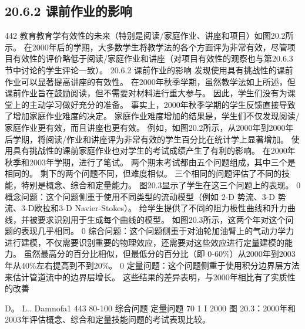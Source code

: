\documentclass[UTF8,11pt,a4paper,openany,fontset=fandol]{ctexbook}
\begin{document}
\subsection{20.6.2 课前作业的影响}
442 教育教育学有效性的未来（特别是阅读/家庭作业、讲座和项目）如图20.2所示。 在2000年后的学期，大多数学生将教学法的各个方面评为非常有效，尽管项目有效性的评价略低于阅读/家庭作业和讲座（对项目有效性的观察也与第20.6.3节中讨论的学生评论一致）。 20.6.2 课前作业的影响 发现使用具有挑战性的课前作业可以显著提高讲座的有效性。 在2000年秋季学期，虽然教学法如上所述，但课前作业旨在鼓励阅读，但不需要对材料进行重大参与。 因此，学生们没有为课堂上的主动学习做好充分的准备。 事实上，2000年秋季学期的学生反馈直接导致了增加家庭作业难度的决定。 家庭作业难度增加的结果是，学生们不仅发现阅读/家庭作业更有效，而且讲座也更有效。 例如，如图20.2所示，从2000年到2000年后学期，将阅读/作业和讲座评为非常有效的学生百分比在统计学上显著增加。 使用具有挑战性的课前家庭作业也对学生的考试成绩产生了有利的影响。 在2000年秋季和2003年学期，进行了笔试。 两个期末考试都由五个问题组成，其中三个是相同的。 剩下的两个问题不同，但难度相似。 三个相同的问题评估了不同的技能，特别是概念、综合和定量能力。 图20.3显示了学生在这三个问题上的表现。 0 概念问题：这个问题侧重于使用不同类型的流动模型（例如 2-D 势流、3-D 势流、3-D欧拉和3-D Navier-Stokes）。 给学生提供了不同的阻力极性曲线和升力曲线，并被要求识别用于生成每个曲线的模型。 如图20.3所示，这两个年对这个问题的表现几乎相同。 0 综合问题：这个问题侧重于对油轮加油臂上的气动力学力进行建模，不仅需要识别重要的物理效应，还需要对这些效应进行定量建模的能力。 虽然最高分的百分比相似，但最低分的百分比（即 0-60\%）从2000年到2003年从40\%左右提高到不到20\%。 0 定量问题：这个问题侧重于使用积分边界层方法来估计管道流中的边界层增长。 这些结果的差异表明，与2000年相比有了实质性的改善

D。 L.. Damnofa1 443 80-100 综合问题 定量问题 70 1 I 2000 图 20.3：2000年和2003年评估概念、综合和定量技能问题的考试表现比较。
\end{document}
